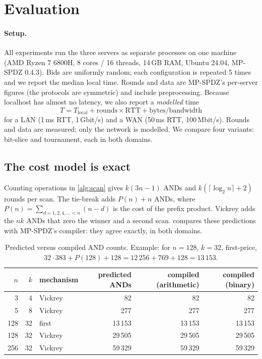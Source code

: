 \documentclass[11pt,a4paper]{article}
\begin{document}
\section{Evaluation}
\label{sec:eval}

\paragraph{Setup.}
All experiments run the three servers as separate processes on one machine (AMD Ryzen 7 6800H,
8 cores / 16 threads, 14\,GB RAM, Ubuntu 24.04, MP-SPDZ 0.4.3). Bids are uniformly random; each
configuration is repeated 5 times and we report the median local time. Rounds and data are
MP-SPDZ's per-server figures (the protocols are symmetric) and include preprocessing. Because
localhost has almost no latency, we also report a \emph{modelled} time
\[
  T = T_\text{local} + \text{rounds} \times \text{RTT} + \text{bytes} / \text{bandwidth}
\]
for a LAN (1\,ms RTT, 1\,Gbit/s) and a WAN (50\,ms RTT, 100\,Mbit/s). Rounds and data are measured;
only the network is modelled. We compare four variants: bit-slice and tournament, each in both
domains.

\subsection{The cost model is exact}

Counting operations in \cref{alg:scan} gives $k(3n-1)$ ANDs and $k(\lceil\log_2 n\rceil + 2)$
rounds per scan. The tie-break adds $P(n) + n$ ANDs, where
$P(n) = \sum_{d = 1, 2, 4, \ldots < n} (n - d)$ is the cost of the prefix product. Vickrey adds the
$nk$ ANDs that zero the winner and a second scan.  compares these predictions with
MP-SPDZ's compiler: they agree exactly, in both domains.

\begin{table}[H]
\centering\small
\begin{tabular}{@{}rrlrrr@{}}
\toprule
$n$ & $k$ & mechanism & predicted ANDs & compiled (arithmetic) & compiled (binary) \\
\midrule
3   & 4  & Vickrey & 82     & 82     & 82 \\
5   & 8  & Vickrey & 277    & 277    & 277 \\
128 & 32 & first   & 13\,153 & 13\,153 & 13\,153 \\
128 & 32 & Vickrey & 29\,505 & 29\,505 & 29\,505 \\
256 & 32 & Vickrey & 59\,329 & 59\,329 & 59\,329 \\
\bottomrule
\end{tabular}
\caption{Predicted versus compiled AND counts. Example: for $n=128$, $k=32$, first-price,
$32 \cdot 383 + P(128) + 128 = 12\,256 + 769 + 128 = 13\,153$.}
\label{tab:model}
\end{table}
\end{document}
